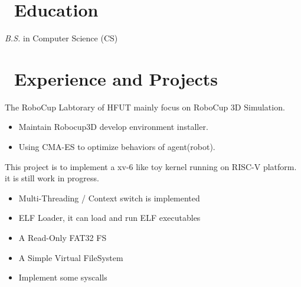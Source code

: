 \documentclass{resume}
\begin{document}



\section{\faGraduationCap\ Education}
\textit{B.S.} in Computer Science (CS)


\section{\faUsers\ Experience and Projects}


The RoboCup Labtorary of HFUT mainly focus on RoboCup 3D Simulation.

\begin{itemize}
  \item Maintain Robocup3D develop environment installer.
  \item Using CMA-ES to optimize behaviors of agent(robot).
\end{itemize}


This project is to implement a xv-6 like toy kernel running on RISC-V platform. it is still work in progress.

\begin{itemize}
  \item Multi-Threading / Context switch is implemented
  \item ELF Loader, it can load and run ELF executables
  \item A Read-Only FAT32 FS
  \item A Simple Virtual FileSystem
  \item Implement some syscalls
\end{itemize}

\end{document}
